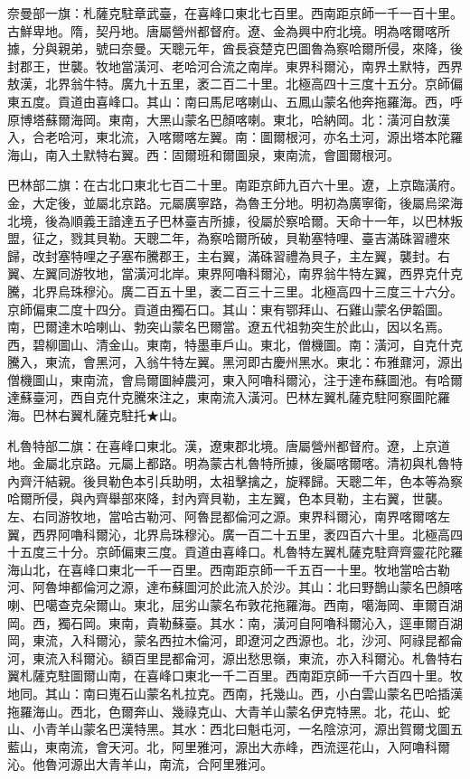 \begin{pinyinscope}
奈曼部一旗：札薩克駐章武臺，在喜峰口東北七百里。西南距京師一千一百十里。古鮮卑地。隋，契丹地。唐屬營州都督府。遼、金為興中府北境。明為喀爾喀所據，分與親弟，號曰奈曼。天聰元年，酋長袞楚克巴圖魯為察哈爾所侵，來降，後封郡王，世襲。牧地當潢河、老哈河合流之南岸。東界科爾沁，南界土默特，西界敖漢，北界翁牛特。廣九十五里，袤二百二十里。北極高四十三度十五分。京師偏東五度。貢道由喜峰口。其山：南曰馬尼喀喇山、五鳳山蒙名他奔拖羅海。西，呼原博塔蘇爾海岡。東南，大黑山蒙名巴顏喀喇。東北，哈納岡。北：潢河自敖漢入，合老哈河，東北流，入喀爾喀左翼。南：圖爾根河，亦名土河，源出塔本陀羅海山，南入土默特右翼。西：固爾班和爾圖泉，東南流，會圖爾根河。

巴林部二旗：在古北口東北七百二十里。南距京師九百六十里。遼，上京臨潢府。金，大定後，並屬北京路。元屬廣寧路，為魯王分地。明初為廣寧衛，後屬烏梁海北境，後為順義王諳達五子巴林臺吉所據，役屬於察哈爾。天命十一年，以巴林叛盟，征之，戮其貝勒。天聰二年，為察哈爾所破，貝勒塞特哩、臺吉滿硃習禮來歸，改封塞特哩之子塞布騰郡王，主右翼，滿硃習禮為貝子，主左翼，襲封。右翼、左翼同游牧地，當潢河北岸。東界阿嚕科爾沁，南界翁牛特左翼，西界克什克騰，北界烏珠穆沁。廣二百五十里，袤二百三十三里。北極高四十三度三十六分。京師偏東二度十四分。貢道由獨石口。其山：東有鄂拜山、石雞山蒙名伊韜圖。南，巴爾達木哈喇山、勃突山蒙名巴爾當。遼五代祖勃突生於此山，因以名焉。西，碧柳圖山、清金山。東南，特墨車戶山。東北，僧機圖。南：潢河，自克什克騰入，東流，會黑河，入翁牛特左翼。黑河即古慶州黑水。東北：布雅鼐河，源出僧機圖山，東南流，會烏爾圖綽農河，東入阿嚕科爾沁，注于達布蘇圖池。有哈爾達蘇臺河，西自克什克騰來注之，東南流入潢河。巴林左翼札薩克駐阿察圖陀羅海。巴林右翼札薩克駐托★山。

札魯特部二旗：在喜峰口東北。漢，遼東郡北境。唐屬營州都督府。遼，上京道地。金屬北京路。元屬上都路。明為蒙古札魯特所據，後屬喀爾喀。清初與札魯特內齊汗結親。後貝勒色本引兵助明，太祖擊擒之，旋釋歸。天聰二年，色本等為察哈爾所侵，與內齊舉部來降，封內齊貝勒，主左翼，色本貝勒，主右翼，世襲。左、右同游牧地，當哈古勒河、阿魯昆都倫河之源。東界科爾沁，南界喀爾喀左翼，西界阿嚕科爾沁，北界烏珠穆沁。廣一百二十五里，袤四百六十里。北極高四十五度三十分。京師偏東三度。貢道由喜峰口。札魯特左翼札薩克駐齊齊靈花陀羅海山北，在喜峰口東北一千一百里。西南距京師一千五百一十里。牧地當哈古勒河、阿魯坤都倫河之源，達布蘇圖河於此流入於沙。其山：北曰野鵲山蒙名巴顏喀喇、巴噶查克朵爾山。東北，屈劣山蒙名布敦花拖羅海。西南，噶海岡、車爾百湖岡。西，獨石岡。東南，貴勒蘇臺。其水：南，潢河自阿嚕科爾沁入，逕車爾百湖岡，東流，入科爾沁，蒙名西拉木倫河，即遼河之西源也。北，沙河、阿祿昆都侖河，東流入科爾沁。額百里昆都侖河，源出愁思嶺，東流，亦入科爾沁。札魯特右翼札薩克駐圖爾山南，在喜峰口東北一千二百里。西南距京師一千六百四十里。牧地同。其山：南曰嵬石山蒙名札拉克。西南，托幾山。西，小白雲山蒙名巴哈插漢拖羅海山。西北，色爾奔山、幾祿克山、大青羊山蒙名伊克特黑。北，花山、蛇山、小青羊山蒙名巴漢特黑。其水：西北曰魁屯河，一名陰涼河，源出賀爾戈圖五藍山，東南流，會天河。北，阿里雅河，源出大赤峰，西流逕花山，入阿嚕科爾沁。他魯河源出大青羊山，南流，合阿里雅河。


\end{pinyinscope}

